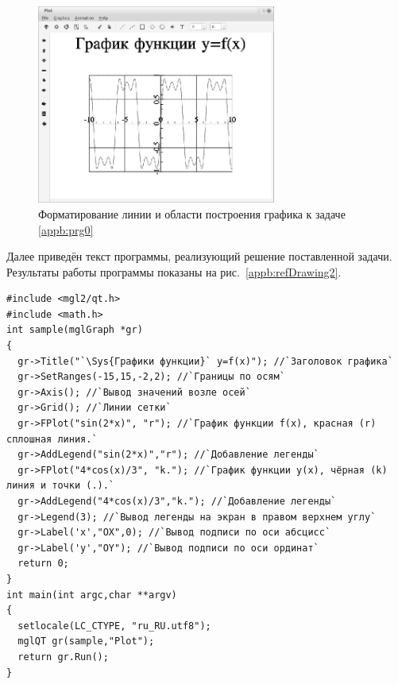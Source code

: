 \begin{figure}[htb]
\begin{center}
\includegraphics[width=0.7\textwidth]{img/ris_appb_2}
\caption{Форматирование линии и области построения графика к задаче \ref{appb:prg0}}
\label{appb:refDrawing1}
\end{center}
\end{figure}


Далее приведён текст программы, реализующий решение поставленной задачи. 
Результаты работы программы показаны на рис.~\ref{appb:refDrawing2}.
\begin{lstlisting}
#include <mgl2/qt.h>
#include <math.h>
int sample(mglGraph *gr)
{  
  gr->Title("`\Sys{Графики функции}` y=f(x)"); //`Заголовок графика`
  gr->SetRanges(-15,15,-2,2); //`Границы по осям`
  gr->Axis(); //`Вывод значений возле осей`
  gr->Grid(); //`Линии сетки`
  gr->FPlot("sin(2*x)", "r"); //`График функции f(x), красная (r) сплошная линия.`
  gr->AddLegend("sin(2*x)","r"); //`Добавление легенды`
  gr->FPlot("4*cos(x)/3", "k."); //`График функции y(x), чёрная (k) линия и точки (.).`
  gr->AddLegend("4*cos(x)/3","k."); //`Добавление легенды`
  gr->Legend(3); //`Вывод легенды на экран в правом верхнем углу`
  gr->Label('x',"OX",0); //`Вывод подписи по оси абсцисс`
  gr->Label('y',"OY"); //`Вывод подписи по оси ординат`
  return 0;
}
int main(int argc,char **argv)
{
  setlocale(LC_CTYPE, "ru_RU.utf8");
  mglQT gr(sample,"Plot");
  return gr.Run();
}
\end{lstlisting}

